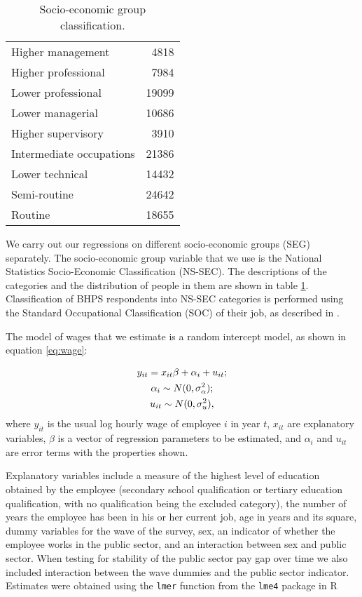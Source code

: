 \documentclass[a4paper,11pt,titlepage]{article}
\begin{document}
\begin{table}[htb]
\caption{Socio-economic group classification.  \label{tab:SEG}}
\begin{center}
\begin{tabular}{lr}
\toprule
  Higher management & 4818 \\
  Higher professional & 7984 \\
  Lower professional & 19099 \\
  Lower managerial & 10686 \\
  Higher supervisory & 3910 \\
  Intermediate occupations & 21386 \\
  Lower technical & 14432 \\
  Semi-routine & 24642 \\
  Routine & 18655 \\
\bottomrule
\end{tabular}
\end{center}
\end{table}

We carry out our regressions on different socio-economic groups (SEG) separately. The socio-economic group variable that we use is the National Statistics Socio-Economic Classification (NS-SEC). The descriptions of the categories and the distribution of people in them are shown in table \ref{tab:SEG}.  Classification of BHPS respondents into NS-SEC categories is performed using the Standard Occupational Classification (SOC) of their job, as described in \citet{Taylor2010}.

The model of wages that we estimate is a random intercept model, as shown in equation \eqref{eq:wage}:

\begin{gather}
y_{it} = x_{it} \beta + \alpha_i + u_{it}; \notag\\
\alpha_i \sim N(0,\sigma_\alpha^2); \label{eq:wage}\\
u_{it} \sim N(0,\sigma_u^2),\notag
\end{gather}
where $y_{it}$ is the usual log hourly wage of employee $i$ in year $t$, $x_{it}$ are explanatory variables, $\beta$ is a vector of regression parameters to be estimated, and $\alpha_i$ and $u_{it}$ are error terms with the properties shown.

Explanatory variables include a measure of the highest level of education obtained by the employee (secondary school qualification or tertiary education qualification, with no qualification being the excluded category), the number of years the employee has been in his or her current job, age in years and its square, dummy variables for the wave of the survey, sex, an indicator of whether the employee works in the public sector, and an interaction between sex and public sector.  When testing for stability of the public sector pay gap over time we also included interaction between the wave dummies and the public sector indicator.  Estimates were obtained using the \texttt{lmer} function from the \texttt{lme4} package in R \citep{R2011,lme2011}
\end{document}
